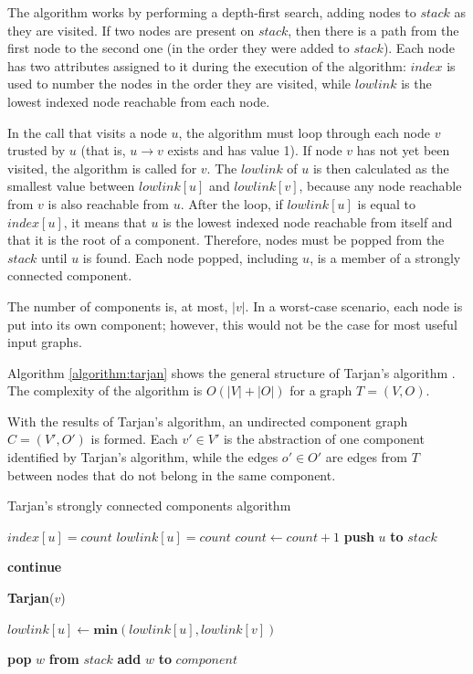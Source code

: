 \documentclass[conference]{IEEEtran}
\begin{document}
The algorithm works by performing a depth-first search, adding nodes to $stack$ as they are visited.
If two nodes are present on $stack$, then there is a path from the first node to the second one (in the order they were added to $stack$).
Each node has two attributes assigned to it during the execution of the algorithm: $index$ is used to number the nodes in the order they are visited, while $lowlink$ is the lowest indexed node reachable from each node.

In the call that visits a node $u$, the algorithm must loop through each node $v$ trusted by $u$ (that is, $u \rightarrow v$ exists and has value 1).
If node $v$ has not yet been visited, the algorithm is called for  $v$.
The $lowlink$ of $u$ is then calculated as the smallest value between $lowlink[u]$ and $lowlink[v]$, because any node reachable from $v$ is also reachable from $u$.
After the loop, if $lowlink[u]$ is equal to $index[u]$, it means that $u$ is the lowest indexed node reachable from itself and that it is the root of a component.
Therefore, nodes must be popped from the $stack$ until $u$ is found.
Each node popped, including $u$, is a member of a strongly connected component.

The number of components is, at most, $|v|$.
In a worst-case scenario, each node is put into its own component; however, this would not be the case for most useful input graphs.

Algorithm \autoref{algorithm:tarjan} shows the general structure of Tarjan's algorithm  \cite{tarjan1972depth}.
The complexity of the algorithm is $O(|V|+|O|)$ for a graph $T = (V,O)$.

With the results of Tarjan's algorithm, an undirected component graph $C = (V',O')$ is formed.
Each $v' \in V'$ is the abstraction of one component identified by Tarjan's algorithm, while the edges $o' \in O'$ are edges from $T$ between nodes that do not belong in the same component.

\begin{algorithm}
\caption{Tarjan's strongly connected components algorithm}\label{algorithm:tarjan}
\begin{algorithmic}[1]


\State $index[u] = count$
\State $lowlink[u] = count$
\State $count \gets count + 1$
\State \textbf{push} $u$ \textbf{to} $stack$

		\State \textbf{continue}
	\EndIf	
		
		\State \textbf{Tarjan}($v$)
	\EndIf
	
	\State $lowlink[u] \gets \textbf{min}(lowlink[u],lowlink[v])$
\EndFor

	\Repeat
		\State \textbf{pop} $w$ \textbf{from} $stack$
		\State \textbf{add} $w$ \textbf{to} $component$
\EndIf

\EndFunction
\end{algorithmic}
\end{algorithm}
\end{document}
